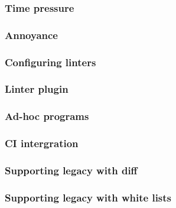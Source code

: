\begin{frame}
\frametitle{Time pressure}
\end{frame}

\begin{frame}
\frametitle{Annoyance}
\end{frame}

\begin{frame}
\frametitle{Configuring linters}
\end{frame}

\begin{frame}
\frametitle{Linter plugin}
\end{frame}

\begin{frame}
\frametitle{Ad-hoc programs}
\end{frame}

\begin{frame}
\frametitle{CI intergration}
\end{frame}

\begin{frame}
\frametitle{Supporting legacy with diff}
\end{frame}

\begin{frame}
\frametitle{Supporting legacy with white lists}
\end{frame}


